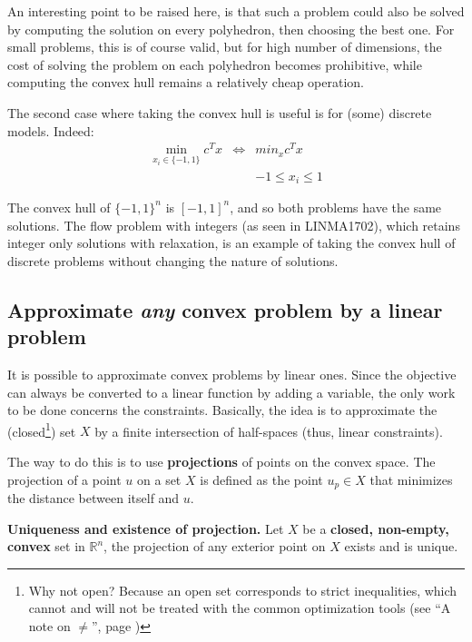 An interesting point to be raised here, is that such a problem could also be solved by computing the solution on every polyhedron, then choosing the best one. For small problems, this is of course valid, but for high number of dimensions, the cost of solving the problem on each polyhedron becomes prohibitive, while computing the convex hull remains a relatively cheap operation. 

The second case where taking the convex hull is useful is for (some) discrete models. Indeed:
$$\begin{array}{ccl}
\min_{x_i \in \{-1,1\}} c^T x & \Longleftrightarrow & min_{x} c^T x  \\
 & & -1 \leq x_i \leq 1
\end{array}$$

The convex hull of $\{-1,1\}^n$ is $[-1,1]^n$, and so both problems have the same solutions. The flow problem with integers (as seen in LINMA1702), which retains integer only solutions with relaxation, is an example of taking the convex hull of discrete problems without changing the nature of solutions. 

\subsection{Approximate \textit{any} convex problem by a linear problem}

It is possible to approximate convex problems by linear ones. Since the objective can always be converted to a linear function by adding a variable, the only work to be done concerns the constraints. Basically, the idea is to approximate the (closed\footnote{Why not open? Because an open set corresponds to strict inequalities, which cannot and will not be treated with the common optimization tools (see ``A note on $\neq$'', page \pageref{note_on_diff})}) set $X$ by a finite intersection of half-spaces (thus, linear constraints).

The way to do this is to use \textbf{projections} of points on the convex space. The projection of a point $u$ on a set $X$ is defined as the point $u_p \in X$ that minimizes the distance between itself and $u$.\\

\begin{theorem}{\textbf{Uniqueness and existence of projection.}}
Let $X$ be a \textbf{closed, non-empty, convex} set in $\mathbb{R}^n$, the projection of any exterior point on $X$ exists and is unique.
\end{theorem}

